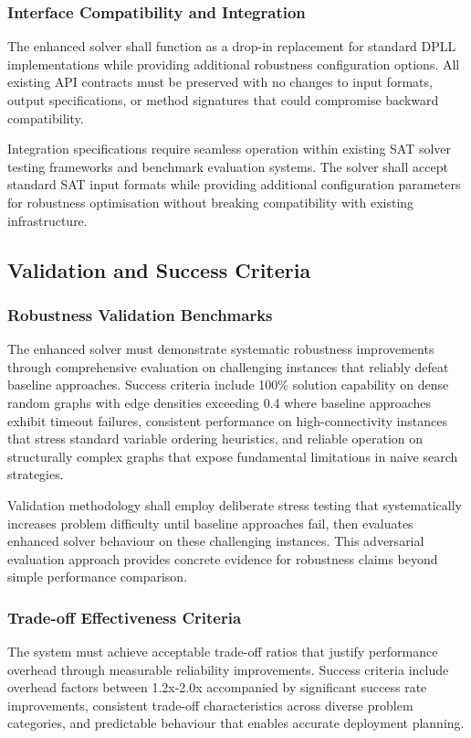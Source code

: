 \subsubsection{Interface Compatibility and Integration}
The enhanced solver shall function as a drop-in replacement for standard DPLL implementations while providing additional robustness configuration options. All existing API contracts must be preserved with no changes to input formats, output specifications, or method signatures that could compromise backward compatibility.

Integration specifications require seamless operation within existing SAT solver testing frameworks and benchmark evaluation systems. The solver shall accept standard SAT input formats while providing additional configuration parameters for robustness optimisation without breaking compatibility with existing infrastructure.

\subsection{Validation and Success Criteria}

\subsubsection{Robustness Validation Benchmarks}
The enhanced solver must demonstrate systematic robustness improvements through comprehensive evaluation on challenging instances that reliably defeat baseline approaches. Success criteria include 100\% solution capability on dense random graphs with edge densities exceeding 0.4 where baseline approaches exhibit timeout failures, consistent performance on high-connectivity instances that stress standard variable ordering heuristics, and reliable operation on structurally complex graphs that expose fundamental limitations in naive search strategies.

Validation methodology shall employ deliberate stress testing that systematically increases problem difficulty until baseline approaches fail, then evaluates enhanced solver behaviour on these challenging instances. This adversarial evaluation approach provides concrete evidence for robustness claims beyond simple performance comparison.

\subsubsection{Trade-off Effectiveness Criteria}
The system must achieve acceptable trade-off ratios that justify performance overhead through measurable reliability improvements. Success criteria include overhead factors between 1.2x-2.0x accompanied by significant success rate improvements, consistent trade-off characteristics across diverse problem categories, and predictable behaviour that enables accurate deployment planning.

